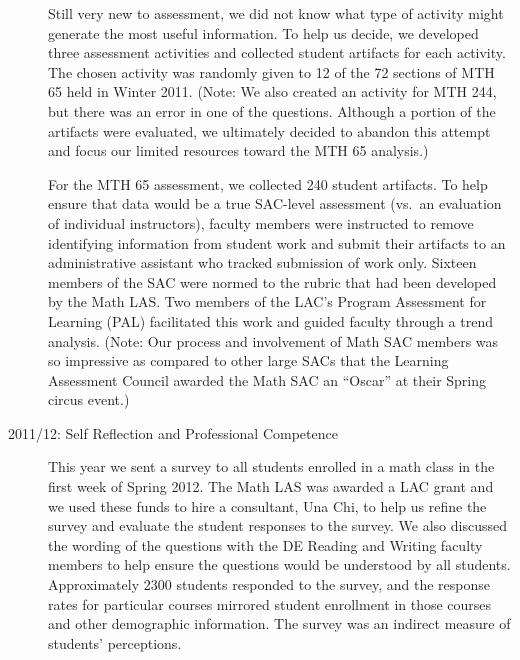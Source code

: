 \begin{description}
	Still very new to assessment, we did not know what type of activity might
	generate the most useful information.  To help us decide, we developed three
	assessment activities and collected student artifacts for each activity.  The
	chosen activity was randomly given to 12 of the 72 sections of MTH 65 held in
	Winter 2011.  (Note: We also created an activity for MTH 244, but there was an
	error in one of the questions.  Although a portion of the artifacts were
	evaluated, we ultimately decided to abandon this attempt and focus our limited
	resources toward the MTH 65 analysis.)

	For the MTH 65 assessment, we collected 240 student artifacts.  To help ensure
	that data would be a true SAC-level assessment (vs.\ an evaluation of individual
	instructors), faculty members were instructed to remove identifying information
	from student work and submit their artifacts to an administrative assistant who
	tracked submission of work only.  Sixteen members of the SAC were normed to the
	rubric that had been developed by the Math LAS.  Two members of the LAC's
	Program Assessment for Learning (PAL) facilitated this work and guided faculty
	through a trend analysis.  (Note: Our process and involvement of Math SAC
	members was so impressive as compared to other large SACs that the Learning
	Assessment Council awarded the Math SAC an ``Oscar'' at their Spring circus
	event.)

	\item[2011/12: Self Reflection and Professional Competence]

	This year we sent a survey to all students enrolled in a math class in the first
	week of Spring 2012.  The Math LAS was awarded a LAC grant and we used these
	funds to hire a consultant, Una Chi, to help us refine the survey and evaluate
	the student responses to the survey.  We also discussed the wording of the
	questions with the DE Reading and Writing faculty members to help ensure the
	questions would be understood by all students. Approximately 2300 students
	responded to the survey, and the response rates for particular courses mirrored
	student enrollment in those courses and other demographic information.  The
	survey was an indirect measure of students' perceptions.


\end{description}
